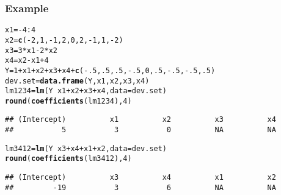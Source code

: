 \documentclass{beamer}\usepackage[]{graphicx}\usepackage[]{color}
\makeatletter
\newcommand{\hlnum}[1]{\textcolor[rgb]{0.686,0.059,0.569}{#1}}%
\newcommand{\hlopt}[1]{\textcolor[rgb]{0,0,0}{#1}}%
\newcommand{\hlstd}[1]{\textcolor[rgb]{0.345,0.345,0.345}{#1}}%
\newcommand{\hlkwb}[1]{\textcolor[rgb]{0.69,0.353,0.396}{#1}}%
\newcommand{\hlkwc}[1]{\textcolor[rgb]{0.333,0.667,0.333}{#1}}%
\newcommand{\hlkwd}[1]{\textcolor[rgb]{0.737,0.353,0.396}{\textbf{#1}}}%
\newenvironment{kframe}{%
 \def\at@end@of@kframe{}%
 \ifinner\ifhmode%
  \def\at@end@of@kframe{\end{minipage}}%
  \begin{minipage}{\columnwidth}%
 \fi\fi%
 \def\FrameCommand##1{\hskip\@totalleftmargin \hskip-\fboxsep
 \colorbox{shadecolor}{##1}\hskip-\fboxsep
     \hskip-\linewidth \hskip-\@totalleftmargin \hskip\columnwidth}%
 \MakeFramed {\advance\hsize-\width
   \@totalleftmargin\z@ \linewidth\hsize
   \@setminipage}}%
 {\par\unskip\endMakeFramed%
 \at@end@of@kframe}
\newenvironment{knitrout}{}{} %
\makeatother
\begin{document}
\begin{frame}[fragile] \frametitle{Example}

\begin{small}
\begin{knitrout}
\color{fgcolor}\begin{kframe}
\begin{alltt}
\hlstd{x1} \hlkwb{=} \hlopt{-}\hlnum{4}\hlopt{:}\hlnum{4}
\hlstd{x2} \hlkwb{=} \hlkwd{c}\hlstd{(}\hlopt{-}\hlnum{2}\hlstd{,} \hlnum{1}\hlstd{,} \hlopt{-}\hlnum{1}\hlstd{,} \hlnum{2}\hlstd{,} \hlnum{0}\hlstd{,} \hlnum{2}\hlstd{,} \hlopt{-}\hlnum{1}\hlstd{,} \hlnum{1}\hlstd{,} \hlopt{-}\hlnum{2}\hlstd{)}
\hlstd{x3} \hlkwb{=} \hlnum{3}\hlopt{*}\hlstd{x1}  \hlopt{-}\hlnum{2}\hlopt{*}\hlstd{x2}
\hlstd{x4} \hlkwb{=} \hlstd{x2} \hlopt{-} \hlstd{x1} \hlopt{+} \hlnum{4}
\hlstd{Y} \hlkwb{=} \hlnum{1}\hlopt{+}\hlstd{x1}\hlopt{+}\hlstd{x2}\hlopt{+}\hlstd{x3}\hlopt{+}\hlstd{x4} \hlopt{+} \hlkwd{c}\hlstd{(}\hlopt{-}\hlnum{.5}\hlstd{,}\hlnum{.5}\hlstd{,}\hlnum{.5}\hlstd{,}\hlopt{-}\hlnum{.5}\hlstd{,}\hlnum{0}\hlstd{,}\hlnum{.5}\hlstd{,}\hlopt{-}\hlnum{.5}\hlstd{,}\hlopt{-}\hlnum{.5}\hlstd{,}\hlnum{.5}\hlstd{)}
\hlstd{dev.set} \hlkwb{=} \hlkwd{data.frame}\hlstd{(Y, x1, x2, x3, x4)}
\hlstd{lm1234} \hlkwb{=} \hlkwd{lm}\hlstd{(Y} \hlopt{~} \hlstd{x1} \hlopt{+} \hlstd{x2} \hlopt{+} \hlstd{x3} \hlopt{+} \hlstd{x4,} \hlkwc{data}\hlstd{=dev.set)}
\hlkwd{round}\hlstd{(}\hlkwd{coefficients}\hlstd{(lm1234),} \hlnum{4}\hlstd{)}
\end{alltt}
\begin{verbatim}
## (Intercept)          x1          x2          x3          x4 
##           5           3           0          NA          NA
\end{verbatim}
\begin{alltt}
\hlstd{lm3412} \hlkwb{=} \hlkwd{lm}\hlstd{(Y} \hlopt{~} \hlstd{x3} \hlopt{+} \hlstd{x4} \hlopt{+} \hlstd{x1} \hlopt{+} \hlstd{x2,} \hlkwc{data} \hlstd{= dev.set)}
\hlkwd{round}\hlstd{(}\hlkwd{coefficients}\hlstd{(lm3412),} \hlnum{4}\hlstd{)}
\end{alltt}
\begin{verbatim}
## (Intercept)          x3          x4          x1          x2 
##         -19           3           6          NA          NA
\end{verbatim}
\end{kframe}
\end{knitrout}
\end{small}
\end{frame}
\end{document}
